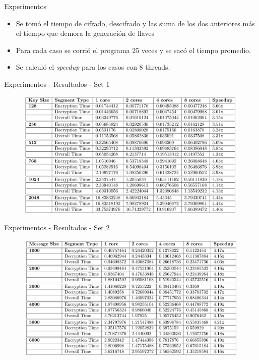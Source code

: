 \documentclass{beamer}c
\begin{document}
\begin{frame}{Experimentos}
   \begin{itemize}
    \item Se tomó el tiempo de cifrado, descifrado y las suma de los dos anteriores más el tiempo
    que demora la generación de llaves
    \item Para cada caso se corrió el programa 25 veces y se sacó el tiempo promedio.
    \item Se calculó el \textit{speedup} para los casos con 8 threads.
   \end{itemize}
\end{frame}

\begin{frame}{Experimentos - Resultados - Set 1}
  \begin{table}
  \begin{figure}
   \includegraphics[scale = 0.25]{2.png}
  \end{figure}
  \caption{Resultados con el \textit{Set 1}}
  \end{table}
\end{frame}

\begin{frame}{Experimentos - Resultados - Set 2}
  \begin{table}
   \begin{figure}
    \includegraphics[scale = 0.24]{3.png}
   \end{figure}
  \caption{Resultados con el \textit{Set 2}}
  \end{table}

 
\end{frame}
\end{document}
